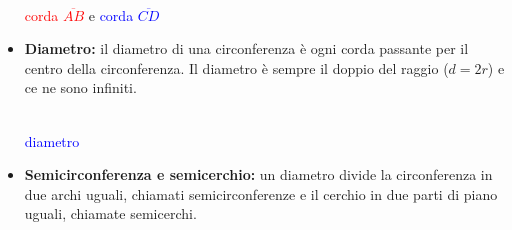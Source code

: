 \documentclass[14pt]{extarticle}
\begin{document}
\begin{itemize}
\begin{center}
            \\
        \textcolor{red}{corda \(\overline{AB}\)} e \textcolor{blue}{corda \(\overline{CD}\)}
        \end{center} 
    \item \textbf{Diametro:} il diametro di una circonferenza è ogni corda passante per il centro della circonferenza. Il diametro è sempre il doppio del raggio (\(d=2r\)) e ce ne sono infiniti.
    \begin{center} %
            \\
        \textcolor{blue}{diametro}
    \end{center} 
    \item \textbf{Semicirconferenza e semicerchio:} un diametro divide la circonferenza in due archi uguali, chiamati semicirconferenze e il cerchio in due parti di piano uguali, chiamate semicerchi.\\
    

\end{itemize}
\end{document}
